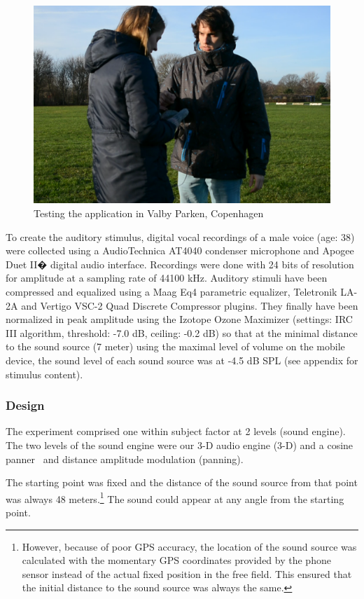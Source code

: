 \documentclass[journal]{IEEEtran}
\begin{document}
\begin{figure}[h!]
 \centering		
   \includegraphics[scale=0.18]{graphics/experiment_AYL}		
 \caption{Testing the application in Valby Parken, Copenhagen}		
  \label{fig:testing}		
\end{figure}

To create the auditory stimulus, digital vocal recordings of a male voice (age: 38) were collected using a AudioTechnica AT4040 condenser microphone and Apogee Duet II� digital audio interface. Recordings were done with 24 bits of resolution for amplitude at a sampling rate of 44100  kHz. Auditory stimuli have been compressed and equalized using a Maag Eq4 parametric equalizer, Teletronik LA-2A and Vertigo VSC-2 Quad Discrete Compressor plugins. They finally have been normalized in peak amplitude using the Izotope Ozone Maximizer (settings: IRC III algorithm, threshold: -7.0 dB, ceiling: -0.2 dB) so that at the minimal distance to the sound source (7 meter) using the maximal level of volume on the mobile device, the sound level of each sound source was at -4.5 dB SPL (see appendix for stimulus content). 

\subsubsection{Design}
The experiment comprised one within subject factor at 2 levels (sound engine). The two levels of the sound engine were our 3-D audio engine (3-D) and a cosine panner~\cite{AndyFarnell2010} and distance amplitude modulation (panning).

The starting point was fixed and the distance of the sound source from that point was always 48 meters.\footnote{However, because of poor GPS accuracy, the location of the sound source was calculated with the momentary GPS coordinates provided by the phone sensor instead of the actual fixed position in the free field. This ensured that the initial distance to the sound source was always the same.} The sound could appear at any angle from the starting point.
\end{document}
